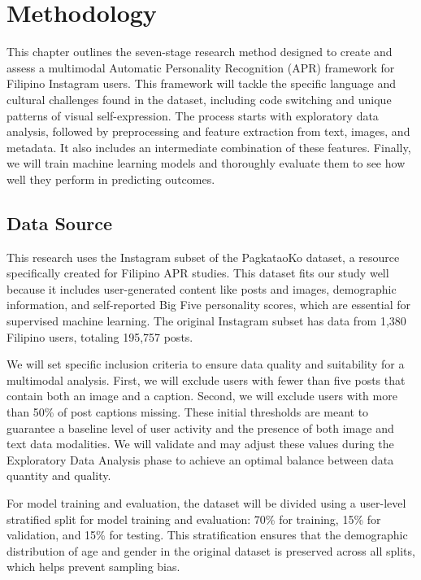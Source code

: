 \chapter{Methodology}
\label{sec:methodology}

This chapter outlines the seven-stage research method designed to create and assess a multimodal Automatic Personality Recognition (APR) framework for Filipino Instagram users. This framework will tackle the specific language and cultural challenges found in the dataset, including code switching and unique patterns of visual self-expression. The process starts with exploratory data analysis, followed by preprocessing and feature extraction from text, images, and metadata. It also includes an intermediate combination of these features. Finally, we will train machine learning models and thoroughly evaluate them to see how well they perform in predicting outcomes.

\section{Data Source}
\label{sec:data}
This research uses the Instagram subset of the PagkataoKo dataset, a resource specifically created for Filipino APR studies. This dataset fits our study well because it includes user-generated content like posts and images, demographic information, and self-reported Big Five personality scores, which are essential for supervised machine learning. The original Instagram subset has data from 1,380 Filipino users, totaling 195,757 posts. 

We will set specific inclusion criteria to ensure data quality and suitability for a multimodal analysis. First, we will exclude users with fewer than five posts that contain both an image and a caption. Second, we will exclude users with more than 50\% of post captions missing. These initial thresholds are meant to guarantee a baseline level of user activity and the presence of both image and text data modalities. We will validate and may adjust these values during the Exploratory Data Analysis phase to achieve an optimal balance between data quantity and quality. 

For model training and evaluation, the dataset will be divided using a user-level stratified split for model training and evaluation: 70\% for training, 15\% for validation, and 15\% for testing. This stratification ensures that the demographic distribution of age and gender in the original dataset is preserved across all splits, which helps prevent sampling bias.

